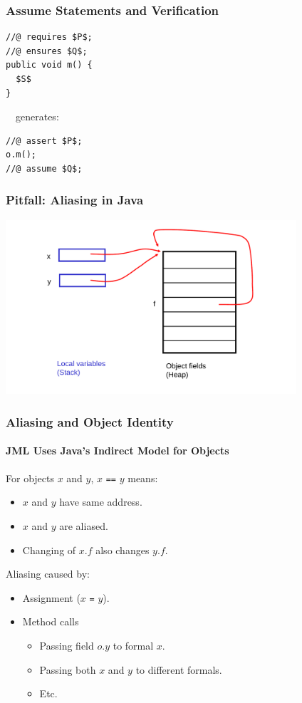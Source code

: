 \begin{frame}[fragile]
\frametitle{Assume Statements and Verification}

\begin{lstlisting}[mathescape=true]
//@ requires $P$;
//@ ensures $Q$;
public void m() {
  $S$
}
\end{lstlisting}

~~generates:

\begin{lstlisting}[mathescape=true]
//@ assert $P$;
o.m();
//@ assume $Q$;
\end{lstlisting}

\end{frame}

\begin{frame}
\frametitle{Pitfall: Aliasing in Java}
\includegraphics[width=4.25in]{aliasxy}
\end{frame}

\begin{frame}
\frametitle{Aliasing and Object Identity}
\framesubtitle{JML Uses Java's Indirect Model for Objects}

For objects $x$ and $y$, $x$ \texttt{==} $y$ means:
\begin{itemize}
\item
$x$ and $y$ have same address.

\item
$x$ and $y$ are aliased.

\item
Changing of $x.f$ also changes $y.f$.
\end{itemize}

Aliasing caused by:
\begin{itemize}
\item
Assignment ($x$ \texttt{=} $y$).

\item
Method calls 
\begin{itemize}
\item
Passing field $o.y$ to formal $x$.

\item
Passing both $x$ and $y$ to different formals.

\item
Etc.
\end{itemize}
\end{itemize}
\end{frame}

